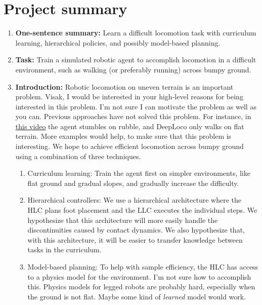 \documentclass[a4paper]{article}
\newcommand{\highlight}[1]{{\leavevmode\color{blue} #1}}
\begin{document}
\section{Project summary}

\begin{enumerate}

\item \textbf{One-sentence summary:}
Learn a difficult locomotion task with curriculum learning, hierarchical policies, and possibly model-based planning.

\item \textbf{Task:}
Train a simulated robotic agent to accomplish locomotion in a difficult environment, such as walking (or preferably running) across bumpy ground.

\item \textbf{Introduction:} Robotic locomotion on uneven terrain is an important problem. \highlight{Visak, I would be interested in your high-level reasons for being interested in this problem. I'm not sure I can motivate the problem as well as you can.} Previous approaches have not solved this problem. For instance, in \href{https://www.youtube.com/watch?v=hx_bgoTF7bs&feature=youtu.be&t=1m28s}{this video} the agent stumbles on rubble, and DeepLoco only walks on flat terrain. \highlight{More examples would help, to make sure that this problem is interesting.} We hope to achieve efficient locomotion across bumpy ground using a combination of three techniques.
  \begin{enumerate}
    \item Curriculum learning: Train the agent first on simpler environments, like flat ground and gradual slopes, and gradually increase the difficulty.
    \item Hierarchical controllers: We use a hierarchical architecture where the HLC plans foot placement and the LLC executes the individual steps. We hypothesize that this architecture will more easily handle the discontinuities caused by contact dynamics. We also hypothesize that, with this architecture, it will be easier to transfer knowledge between tasks in the curriculum.
    \item Model-based planning: To help with sample efficiency, the HLC has access to a physics model for the environment. \highlight{I'm not sure how to accomplish this. Physics models for legged robots are probably hard, especially when the ground is not flat. Maybe some kind of \emph{learned} model would work.}
  \end{enumerate}


\end{enumerate}
\end{document}

